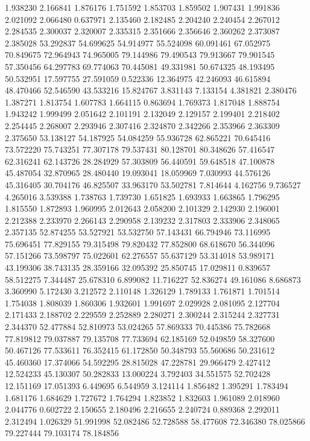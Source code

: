1.938230
2.166841
1.876176
1.751592
1.853703
1.859502
1.907431
1.991836
2.021092
2.066480
0.637971
2.135460
2.182485
2.204240
2.240454
2.267012
2.284535
2.300037
2.320007
2.335315
2.351666
2.356646
2.360262
2.373087
2.385028
53.292837
54.699625
54.914977
55.524098
60.091461
67.052975
70.849675
72.964943
74.965005
79.144986
79.490543
79.913667
79.901545
57.350456
64.297783
69.774063
70.445081
49.331981
50.674325
48.193495
50.532951
17.597755
27.591059
0.522336
12.364975
42.246093
46.615894
48.470466
52.546590
43.533216
15.824767
3.831143
7.133154
4.381821
2.380476
1.387271
1.813754
1.607783
1.664115
0.863694
1.769373
1.817048
1.888754
1.943242
1.999499
2.051642
2.101191
2.132049
2.129157
2.199401
2.218402
2.254445
2.268007
2.293946
2.307416
2.324870
2.342266
2.353966
2.363309
2.375650
53.138127
54.187925
54.084259
55.936728
62.865221
70.645416
73.572220
75.743251
77.307178
79.537431
80.128701
80.348626
57.416547
62.316241
62.143726
28.284929
57.303809
56.440591
59.648518
47.100878
45.487054
32.870965
28.480440
19.093041
18.059969
7.030993
44.576126
45.316405
30.704176
46.825507
33.963170
53.502781
7.814644
4.162756
9.736527
4.265016
3.539388
1.738763
1.739730
1.651825
1.693933
1.663865
1.796295
1.815550
1.872893
1.960995
2.012643
2.058200
2.101329
2.142930
2.196001
2.212388
2.233970
2.266143
2.290958
2.139232
2.317803
2.333906
2.348065
2.357135
52.874255
53.527921
53.532750
57.143431
66.794946
73.116995
75.696451
77.829155
79.315498
79.820432
77.852800
68.618670
56.344096
57.151266
73.598797
75.022601
62.276557
55.637129
53.314018
53.989171
43.199306
38.743135
28.359166
32.095392
25.850745
17.029811
0.839657
58.512275
7.344487
25.678310
6.899082
11.716227
52.836274
49.161086
8.686873
3.360990
5.172430
3.212572
2.110148
1.326129
1.789133
1.761871
1.701514
1.754038
1.808039
1.860306
1.932601
1.991697
2.029928
2.081095
2.127704
2.171433
2.188702
2.229559
2.252889
2.280271
2.300244
2.315244
2.327731
2.344370
52.477884
52.810973
53.024265
57.869333
70.445386
75.782668
77.819812
79.037887
79.135708
77.733694
62.185169
52.049859
58.327600
50.467126
77.533611
76.352415
61.172850
50.348793
55.560686
50.231612
45.460360
17.374066
54.592295
28.815028
47.228781
29.966479
2.427412
12.524233
45.130307
50.282833
13.000224
3.792403
34.551575
52.702428
12.151169
17.051393
6.449695
6.544959
3.124114
1.856482
1.395291
1.783494
1.681176
1.684629
1.727672
1.764294
1.823852
1.832603
1.961089
2.018960
2.044776
0.602722
2.150655
2.180496
2.216655
2.240724
0.889368
2.292011
2.312494
1.026329
51.991998
52.082486
52.728588
58.477608
72.346380
78.025866
79.227444
79.103174
78.184856
